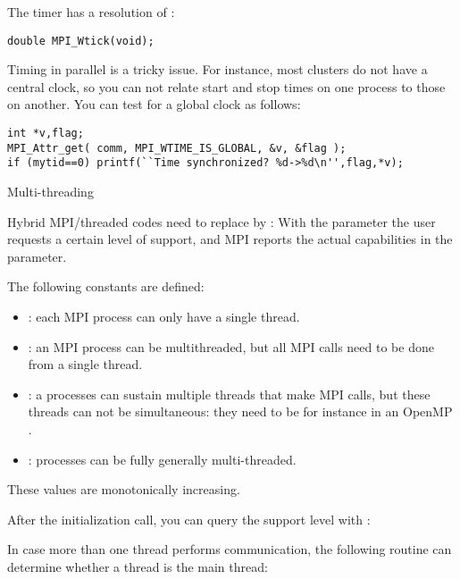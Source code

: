 The timer has a resolution of :
\begin{verbatim}
double MPI_Wtick(void);
\end{verbatim}

Timing in parallel is a tricky issue. For instance, most clusters do
not have a central clock, so you can not relate start and stop times
on one process to those on another. You can test for a global clock as
follows:
\begin{verbatim}
int *v,flag;
MPI_Attr_get( comm, MPI_WTIME_IS_GLOBAL, &v, &flag );
if (mytid==0) printf(``Time synchronized? %d->%d\n'',flag,*v);
\end{verbatim}


 {Multi-threading}

Hybrid MPI/threaded codes need to replace 
by :
%
%
With the  parameter the user requests a certain level of support,
and MPI reports the actual capabilities in the  parameter.

The following constants are defined:
\begin{itemize}
\item {}: each MPI process can only have
  a single thread.
\item {}: an MPI process can be
  multithreaded, but all MPI calls need to be done from a single
  thread.
\item {}: a processes can sustain
  multiple threads that make MPI calls, but these threads can not be
  simultaneous: they need to be for instance in an OpenMP
  .
\item {}: processes can be fully
  generally multi-threaded.
\end{itemize}
These values are monotonically increasing.

After the initialization call, you can query the support level
with :
%

In case more than one thread performs communication, the following routine
can determine whether a thread is the main thread:
%
